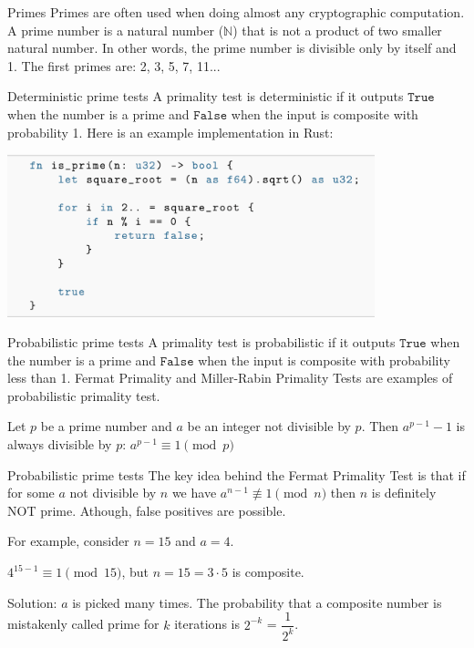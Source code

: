 \documentclass{beamer}
\begin{document}
    \begin{frame}{Primes}
        Primes are often used when doing almost any cryptographic computation. A prime number is a natural number ($\mathbb{N}$) that is not a product
        of two smaller natural number. In other words, the prime number is divisible only by itself and 1. The first primes are: 2, 3, 5, 7, 11...
        
    \end{frame}

    \begin{frame}{Deterministic prime tests}
        A primality test is deterministic if it outputs $\mathtt{True}$ when the number is a prime and $\mathtt{False}$ when the input is composite with probability 1.
        Here is an example implementation in Rust: 

        \centering
        \includegraphics[width=0.8\textwidth]{images/lecture_2/prime-test-det.png}
    \end{frame}


    \begin{frame}{Probabilistic prime tests}
        A primality test is probabilistic if it outputs $\mathtt{True}$ when the number is a prime and $\mathtt{False}$ when the input is composite with probability less than 1.
        Fermat Primality and Miller-Rabin Primality Tests are examples of probabilistic primality test. 

        \begin{theorem}
            Let $p$ be a prime number and $a$ be an integer not divisible by $p$. Then $a ^ {p-1} - 1$ is always divisible by $p$:  $a^{p-1} \equiv 1 \pmod{p}$
        \end{theorem}
    \end{frame}

    \begin{frame}{Probabilistic prime tests}
        The key idea behind the Fermat Primality Test is that if for some $a$ not divisible by $n$ we have $a^{n-1} \not\equiv 1 \pmod{n}$ then $n$ is definitely NOT prime.
        Athough, false positives are possible. 
        
        \vspace{15px}

        For example, consider $n = 15$ and $a = 4$.
        
        $4^{15-1} \equiv 1 \pmod{15}$, but $n = 15 = 3 \cdot 5$ is composite. 
        
        \vspace{15px}
        Solution: $a$ is picked many times.
        The probability that a composite number is mistakenly called prime for $k$ iterations is $2^{-k}$ = $\dfrac{1}{2^k}$.
    \end{frame}
\end{document}
